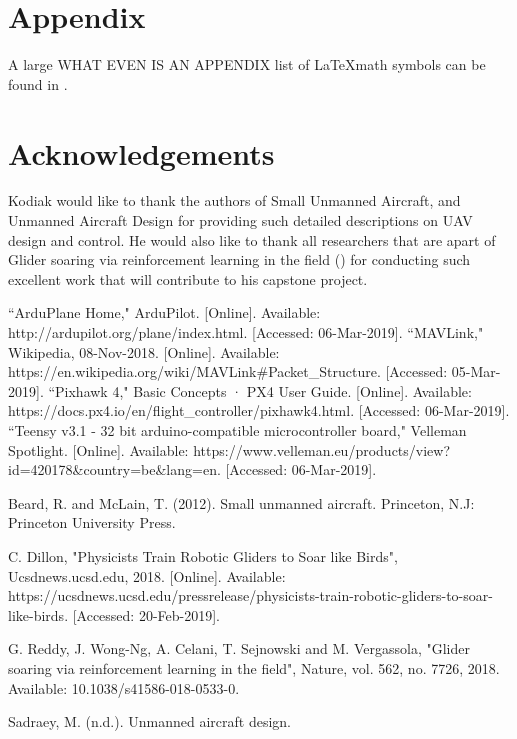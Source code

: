 \documentclass[12pt,journal,compsoc]{IEEEtran}
\begin{document}
\appendices
\section*{Appendix}
A large WHAT EVEN IS AN APPENDIX list of \LaTeX math symbols can be found in \cite{Symbols}.

\section*{Acknowledgements}
Kodiak would like to thank the authors of Small Unmanned Aircraft, and Unmanned Aircraft Design for providing such detailed descriptions on UAV design and control. He would also like to thank all researchers that are apart of Glider soaring via reinforcement learning in the field (\cite{GliderBirds}) for conducting such excellent work that will contribute to his capstone project.

\begin{thebibliography}{1}
``ArduPlane Home," ArduPilot. [Online]. Available: http://ardupilot.org/plane/index.html. [Accessed: 06-Mar-2019].
``MAVLink," Wikipedia, 08-Nov-2018. [Online]. Available: https://en.wikipedia.org/wiki/MAVLink\#Packet\_Structure. [Accessed: 05-Mar-2019].
``Pixhawk 4," Basic Concepts · PX4 User Guide. [Online]. Available: https://docs.px4.io/en/flight\_controller/pixhawk4.html. [Accessed: 06-Mar-2019].
``Teensy v3.1 - 32 bit arduino-compatible microcontroller board," Velleman Spotlight. [Online]. Available: https://www.velleman.eu/products/view?id=420178\&country=be\&lang=en. [Accessed: 06-Mar-2019].

Beard, R. and McLain, T. (2012). Small unmanned aircraft. Princeton, N.J: Princeton University Press.

C. Dillon, "Physicists Train Robotic Gliders to Soar like Birds", Ucsdnews.ucsd.edu, 2018. [Online]. Available: https://ucsdnews.ucsd.edu/pressrelease/physicists-train-robotic-gliders-to-soar-like-birds. [Accessed: 20-Feb-2019].

G. Reddy, J. Wong-Ng, A. Celani, T. Sejnowski and M. Vergassola, "Glider soaring via reinforcement learning in the field", Nature, vol. 562, no. 7726, 2018. Available: 10.1038/s41586-018-0533-0.

Sadraey, M. (n.d.). Unmanned aircraft design.


\end{thebibliography}
\end{document}
